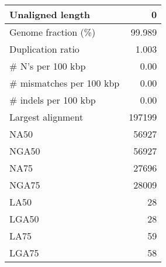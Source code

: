 \documentclass[12pt,a4paper]{article}
\begin{document}
\begin{table}[ht]
\begin{center}
\begin{tabular}{|l*{1}{|r}|}
Unaligned length & 0 \\ \hline
Genome fraction (\%) & 99.989 \\ \hline
Duplication ratio & 1.003 \\ \hline
\# N's per 100 kbp & 0.00 \\ \hline
\# mismatches per 100 kbp & 0.00 \\ \hline
\# indels per 100 kbp & 0.00 \\ \hline
Largest alignment & 197199 \\ \hline
NA50 & 56927 \\ \hline
NGA50 & 56927 \\ \hline
NA75 & 27696 \\ \hline
NGA75 & 28009 \\ \hline
LA50 & 28 \\ \hline
LGA50 & 28 \\ \hline
LA75 & 59 \\ \hline
LGA75 & 58 \\ \hline
\end{tabular}
\end{center}
\end{table}
\end{document}
